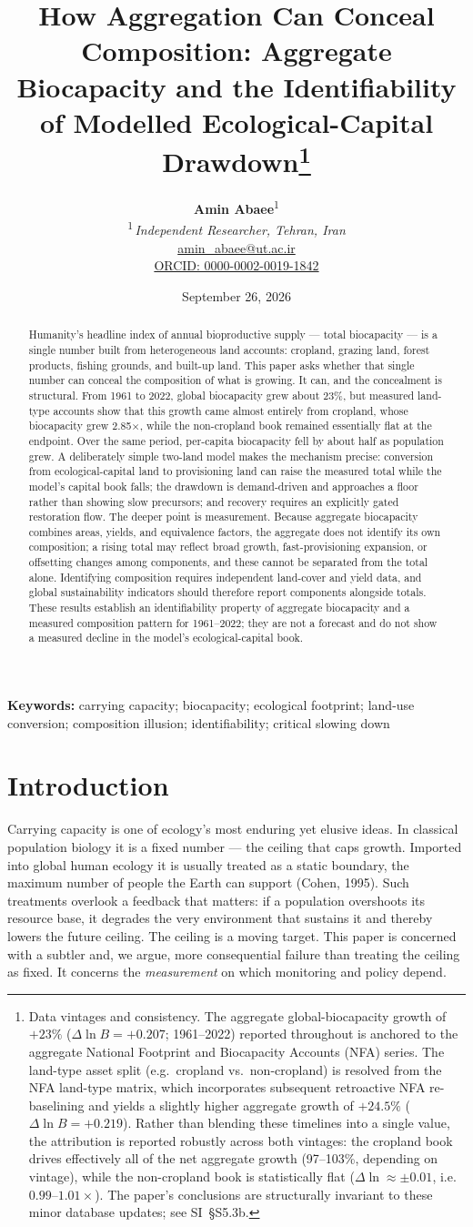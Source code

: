\documentclass[11pt]{article}
\title{How Aggregation Can Conceal Composition: Aggregate Biocapacity and the Identifiability of Modelled Ecological-Capital Drawdown\thanks{Data vintages and consistency. The aggregate global-biocapacity growth of $+23\%$ ($\Delta\ln B=+0.207$; 1961--2022) reported throughout is anchored to the aggregate National Footprint and Biocapacity Accounts (NFA) series. The land-type asset split (e.g.\ cropland vs.\ non-cropland) is resolved from the NFA land-type matrix, which incorporates subsequent retroactive NFA re-baselining and yields a slightly higher aggregate growth of $+24.5\%$ ($\Delta\ln B=+0.219$). Rather than blending these timelines into a single value, the attribution is reported robustly across both vintages: the cropland book drives effectively all of the net aggregate growth (\raisebox{0pt}{$\approx$}97--103\%, depending on vintage), while the non-cropland book is statistically flat ($\Delta\ln\approx\pm0.01$, i.e.\ $0.99$--$1.01\times$). The paper's conclusions are structurally invariant to these minor database updates; see SI~§S5.3b.}}
\author{
  \textbf{Amin Abaee}\textsuperscript{1}\\
  \textsuperscript{1}\,\textit{Independent Researcher, Tehran, Iran}\\
  \href{mailto:amin_abaee@ut.ac.ir}{amin\_abaee@ut.ac.ir}\\
  \href{https://orcid.org/0000-0002-0019-1842}{ORCID: 0000-0002-0019-1842}
}
\date{September 26, 2026}
\begin{document}
\maketitle

\begin{abstract}
Humanity's headline index of annual bioproductive supply --- total biocapacity --- is a single number built from heterogeneous land accounts: cropland, grazing land, forest products, fishing grounds, and built-up land. This paper asks whether that single number can conceal the composition of what is growing. It can, and the concealment is structural. From 1961 to 2022, global biocapacity grew about 23\%, but measured land-type accounts show that this growth came almost entirely from cropland, whose biocapacity grew 2.85$\times$, while the non-cropland book remained essentially flat at the endpoint. Over the same period, per-capita biocapacity fell by about half as population grew. A deliberately simple two-land model makes the mechanism precise: conversion from ecological-capital land to provisioning land can raise the measured total while the model's capital book falls; the drawdown is demand-driven and approaches a floor rather than showing slow precursors; and recovery requires an explicitly gated restoration flow. The deeper point is measurement. Because aggregate biocapacity combines areas, yields, and equivalence factors, the aggregate does not identify its own composition; a rising total may reflect broad growth, fast-provisioning expansion, or offsetting changes among components, and these cannot be separated from the total alone. Identifying composition requires independent land-cover and yield data, and global sustainability indicators should therefore report components alongside totals. These results establish an identifiability property of aggregate biocapacity and a measured composition pattern for 1961--2022; they are not a forecast and do not show a measured decline in the model's ecological-capital book.
\end{abstract}

\medskip
\noindent\textbf{Keywords:} carrying capacity; biocapacity; ecological footprint; land-use conversion; composition illusion; identifiability; critical slowing down

\section{Introduction}

Carrying capacity is one of ecology's most enduring yet elusive ideas. In classical population biology it is a fixed number --- the ceiling that caps growth. Imported into global human ecology it is usually treated as a static boundary, the maximum number of people the Earth can support (Cohen, 1995). Such treatments overlook a feedback that matters: if a population overshoots its resource base, it degrades the very environment that sustains it and thereby lowers the future ceiling. The ceiling is a moving target. This paper is concerned with a subtler and, we argue, more consequential failure than treating the ceiling as fixed. It concerns the \emph{measurement} on which monitoring and policy depend.
\end{document}
